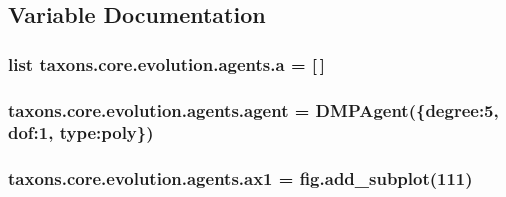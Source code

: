 \subsection{Variable Documentation}
\subsubsection[{\texorpdfstring{a}{a}}]{\setlength{\rightskip}{0pt plus 5cm}list taxons.\+core.\+evolution.\+agents.\+a = \mbox{[}$\,$\mbox{]}}\hypertarget{namespacetaxons_1_1core_1_1evolution_1_1agents_a97819a12f14cfc87de2cdbc971c00bc7}{}\label{namespacetaxons_1_1core_1_1evolution_1_1agents_a97819a12f14cfc87de2cdbc971c00bc7}
\subsubsection[{\texorpdfstring{agent}{agent}}]{\setlength{\rightskip}{0pt plus 5cm}taxons.\+core.\+evolution.\+agents.\+agent = {\bf D\+M\+P\+Agent}(\{\textquotesingle{}degree\textquotesingle{}\+:5, \textquotesingle{}dof\textquotesingle{}\+:1, \textquotesingle{}type\textquotesingle{}\+:\textquotesingle{}poly\textquotesingle{}\})}\hypertarget{namespacetaxons_1_1core_1_1evolution_1_1agents_a589089f38a7adde0389093ecdc99ed74}{}\label{namespacetaxons_1_1core_1_1evolution_1_1agents_a589089f38a7adde0389093ecdc99ed74}
\subsubsection[{\texorpdfstring{ax1}{ax1}}]{\setlength{\rightskip}{0pt plus 5cm}taxons.\+core.\+evolution.\+agents.\+ax1 = fig.\+add\+\_\+subplot(111)}\hypertarget{namespacetaxons_1_1core_1_1evolution_1_1agents_aa4a5576b82bee8c8dd496b863356338e}{}\label{namespacetaxons_1_1core_1_1evolution_1_1agents_aa4a5576b82bee8c8dd496b863356338e}
